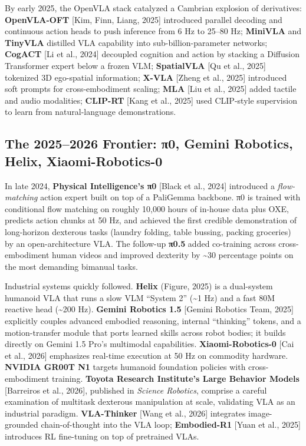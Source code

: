 By early 2025, the OpenVLA stack catalyzed a Cambrian explosion of derivatives: \textbf{OpenVLA-OFT} {[}Kim, Finn, Liang, 2025{]} introduced parallel decoding and continuous action heads to push inference from 6 Hz to 25--80 Hz; \textbf{MiniVLA} and \textbf{TinyVLA} distilled VLA capability into sub-billion-parameter networks; \textbf{CogACT} {[}Li et al., 2024{]} decoupled cognition and action by stacking a Diffusion Transformer expert below a frozen VLM; \textbf{SpatialVLA} {[}Qu et al., 2025{]} tokenized 3D ego-spatial information; \textbf{X-VLA} {[}Zheng et al., 2025{]} introduced soft prompts for cross-embodiment scaling; \textbf{MLA} {[}Liu et al., 2025{]} added tactile and audio modalities; \textbf{CLIP-RT} {[}Kang et al., 2025{]} used CLIP-style supervision to learn from natural-language demonstrations.

\subsection{The 2025--2026 Frontier: π0, Gemini Robotics, Helix, Xiaomi-Robotics-0}\label{the-20252026-frontier-ux3c00-gemini-robotics-helix-xiaomi-robotics-0}

In late 2024, \textbf{Physical Intelligence's π0} {[}Black et al., 2024{]} introduced a \emph{flow-matching} action expert built on top of a PaliGemma backbone. π0 is trained with conditional flow matching on roughly 10,000 hours of in-house data plus OXE, predicts action chunks at 50 Hz, and achieved the first credible demonstration of long-horizon dexterous tasks (laundry folding, table bussing, packing groceries) by an open-architecture VLA. The follow-up \textbf{π0.5} added co-training across cross-embodiment human videos and improved dexterity by \textasciitilde30 percentage points on the most demanding bimanual tasks.

Industrial systems quickly followed. \textbf{Helix} (Figure, 2025) is a dual-system humanoid VLA that runs a slow VLM ``System 2'' (\textasciitilde1 Hz) and a fast 80M reactive head (\textasciitilde200 Hz). \textbf{Gemini Robotics 1.5} {[}Gemini Robotics Team, 2025{]} explicitly couples advanced embodied reasoning, internal ``thinking'' tokens, and a motion-transfer module that ports learned skills across robot bodies; it builds directly on Gemini 1.5 Pro's multimodal capabilities. \textbf{Xiaomi-Robotics-0} {[}Cai et al., 2026{]} emphasizes real-time execution at 50 Hz on commodity hardware. \textbf{NVIDIA GR00T N1} targets humanoid foundation policies with cross-embodiment training. \textbf{Toyota Research Institute's Large Behavior Models} {[}Barreiros et al., 2026{]}, published in \emph{Science Robotics}, comprise a careful examination of multitask dexterous manipulation at scale, validating VLA as an industrial paradigm. \textbf{VLA-Thinker} {[}Wang et al., 2026{]} integrates image-grounded chain-of-thought into the VLA loop; \textbf{Embodied-R1} {[}Yuan et al., 2025{]} introduces RL fine-tuning on top of pretrained VLAs.

